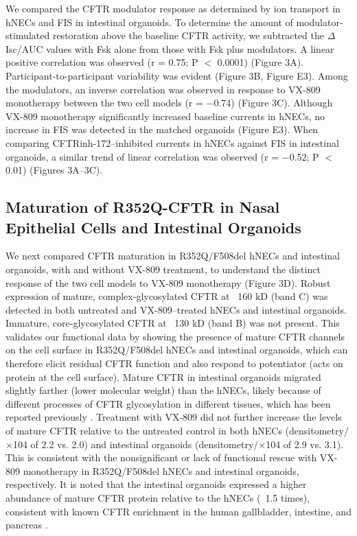 We compared the CFTR modulator response as determined by ion transport in hNECs and FIS in intestinal organoids. To determine the amount of modulator-stimulated restoration above the baseline CFTR activity, we subtracted the $\Delta$Isc/AUC values with Fsk alone from those with Fsk plus modulators. A linear positive correlation was observed (r = 0.75; P $<$ 0.0001) (Figure 3A). Participant-to-participant variability was evident (Figure 3B, Figure E3). Among the modulators, an inverse correlation was observed in response to VX-809 monotherapy between the two cell models (r = −0.74) (Figure 3C). Although VX-809 monotherapy significantly increased baseline currents in hNECs, no increase in FIS was detected in the matched organoids (Figure E3). When comparing CFTRinh-172–inhibited currents in hNECs against FIS in intestinal organoids, a similar trend of linear correlation was observed (r = −0.52; P $<$ 0.01) (Figures 3A–3C).

\subsection{Maturation of R352Q-CFTR in Nasal Epithelial Cells and Intestinal Organoids}

We next compared CFTR maturation in R352Q/F508del hNECs and intestinal organoids, with and without VX-809 treatment, to understand the distinct response of the two cell models to VX-809 monotherapy (Figure 3D). Robust expression of mature, complex-glycosylated CFTR at ~160 kD (band C) was detected in both untreated and VX-809–treated hNECs and intestinal organoids. Immature, core-glycosylated CFTR at ~130 kD (band B) was not present. This validates our functional data by showing the presence of mature CFTR channels on the cell surface in R352Q/F508del hNECs and intestinal organoids, which can therefore elicit residual CFTR function and also respond to potentiator (acts on protein at the cell surface). Mature CFTR in intestinal organoids migrated slightly farther (lower molecular weight) than the hNECs, likely because of different processes of CFTR glycosylation in different tissues, which has been reported previously \cite{vanbarneveld2010}. Treatment with VX-809 did not further increase the levels of mature CFTR relative to the untreated control in both hNECs (densitometry/×104 of 2.2 vs. 2.0) and intestinal organoids (densitometry/×104 of 2.9 vs. 3.1). This is consistent with the nonsignificant or lack of functional rescue with VX-809 monotherapy in R352Q/F508del hNECs and intestinal organoids, respectively. It is noted that the intestinal organoids expressed a higher abundance of mature CFTR protein relative to the hNECs (~1.5 times), consistent with known CFTR enrichment in the human gallbladder, intestine, and pancreas \cite{human_protein_atlas_2021, uhlen2015}.

